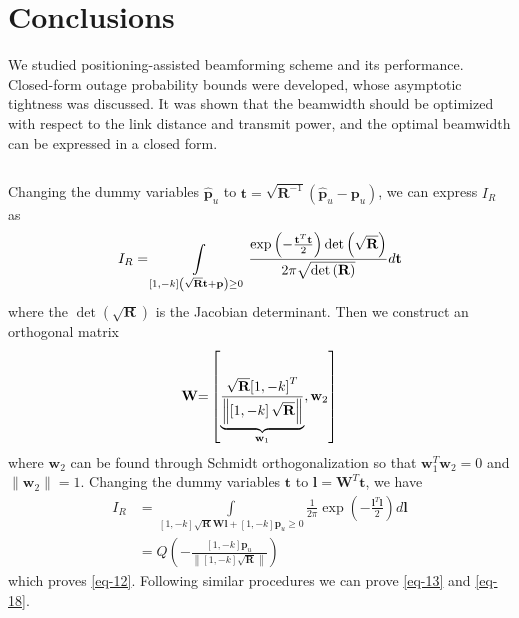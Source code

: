 \documentclass{IEEEtran}
\begin{document}
\vspace{-5pt}


\section{Conclusions}\label{conclusions}
We studied positioning-assisted beamforming scheme and its performance. Closed-form outage probability bounds were developed, whose asymptotic tightness was discussed. It was shown that the beamwidth should be optimized with respect to the link distance and transmit power, and the optimal beamwidth can be expressed in a closed form.

\begin{appendices}
\section{}\label{Integral_Simplify}
Changing the dummy variables $\hat {\textbf{p}}_u$ to ${\textbf{t}} = \sqrt {{{\textbf{R}}^{ - 1}}} \left( {\hat {\textbf{p}}_u- {{\textbf{p}}_u}} \right)$, we can express $I_R$ as
\begin{equation}\label{A-1}
{I_R} = \int\limits_{\left[ {1, - k} \right]\left( {\sqrt {\textbf{R}} {\textbf{t}} + {\textbf{p}}} \right) \ge 0} {\frac{{\exp \left( { - \frac{{{{\bf{t}}^T}{\textbf{t}}}}{2}} \right)\det \left( {\sqrt {\textbf{R}} } \right)}}{{2\pi \sqrt {\det \left( {\textbf{R}} \right)} }}d} {\textbf{t}}
\end{equation}
where the $\det ( {\sqrt {\textbf{R}} })$ is the Jacobian determinant. Then we construct an orthogonal matrix
\begin{equation}\label{A2}
{\textbf{W}}{\rm{ = }}\left[ {\underbrace {\frac{{\sqrt {\textbf{R}} {{\left[ {1, - k} \right]}^T}}}{{\left\| {\left[ {1, - k} \right]\sqrt {\textbf{R}} } \right\|}}}_{{{\textbf{w}}_1}},{{\textbf{w}}_2}} \right]
\end{equation}
where $\textbf{w}_2$ can be found through Schmidt orthogonalization so that ${\textbf{w}}_1^T{\textbf{w}}_2=0$ and $\|{\textbf{w}}_2\|=1$. Changing the dummy variables $\textbf{t}$ to ${\textbf{l}} = {{\textbf{W}}^T\textbf{t}}$, we have
\begin{equation}\label{A3}
\begin{split}
{I_R} &= \int\limits_{\left[ {1, - k} \right]\sqrt {\textbf{R}} {\textbf{Wl}} + \left[ {1, - k} \right]{{\textbf{p}}_u} \ge 0} {\frac{1}{2\pi }{\exp \left( { - \frac{{{{\textbf{l}}^T}{\textbf{l}}}}{2}} \right)}d} {\textbf{l}}\\
 &= Q\left( { - \frac{{\left[ {1, - k} \right]{{\textbf{p}}_u}}}{{\left\| {\left[ {1, - k} \right]\sqrt {\textbf{R}} } \right\|}}} \right)
\end{split}
\end{equation}
which proves \eqref{eq-12}. Following similar procedures we can prove \eqref{eq-13} and \eqref{eq-18}.




\end{appendices}
\end{document}
